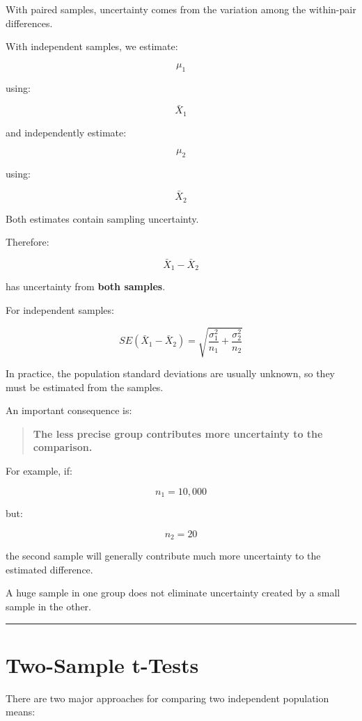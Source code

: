 \documentclass[
  letterpaper,
  DIV=11,
  numbers=noendperiod]{scrreprt}
\begin{document}
With paired samples, uncertainty comes from the variation among the
within-pair differences.

With independent samples, we estimate:

\[
\mu_1
\]

using:

\[
\bar{X}_1
\]

and independently estimate:

\[
\mu_2
\]

using:

\[
\bar{X}_2
\]

Both estimates contain sampling uncertainty.

Therefore:

\[
\bar{X}_1-\bar{X}_2
\]

has uncertainty from \textbf{both samples}.

For independent samples:

\[
SE(\bar{X}_1-\bar{X}_2)
=
\sqrt{
\frac{\sigma_1^2}{n_1}
+
\frac{\sigma_2^2}{n_2}
}
\]

In practice, the population standard deviations are usually unknown, so
they must be estimated from the samples.

An important consequence is:

\begin{quote}
\textbf{The less precise group contributes more uncertainty to the
comparison.}
\end{quote}

For example, if:

\[
n_1=10{,}000
\]

but:

\[
n_2=20
\]

the second sample will generally contribute much more uncertainty to the
estimated difference.

A huge sample in one group does not eliminate uncertainty created by a
small sample in the other.

\begin{center}\rule{0.5\linewidth}{0.5pt}\end{center}


\chapter{Two-Sample t-Tests}\label{two-sample-t-tests}

There are two major approaches for comparing two independent population
means:
\end{document}
